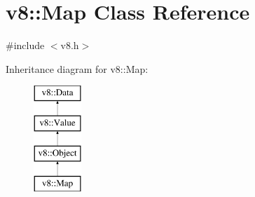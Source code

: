 \hypertarget{classv8_1_1_map}{}\section{v8\+:\+:Map Class Reference}
\label{classv8_1_1_map}


{\ttfamily \#include $<$v8.\+h$>$}

Inheritance diagram for v8\+:\+:Map\+:\begin{figure}[H]
\begin{center}
\leavevmode
\includegraphics[height=4.000000cm]{classv8_1_1_map}
\end{center}
\end{figure}
